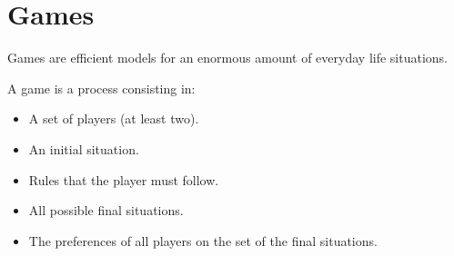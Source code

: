 \section{Games}

Games are efficient models for an enormous amount of everyday life situations. 
\begin{definition}
    A game is a process consisting in: 
        \begin{itemize}
            \item A set of players (at least two). 
            \item An initial situation. 
            \item Rules that the player must follow. 
            \item All possible final situations. 
            \item The preferences of all players on the set of the final situations.
        \end{itemize}
\end{definition}










